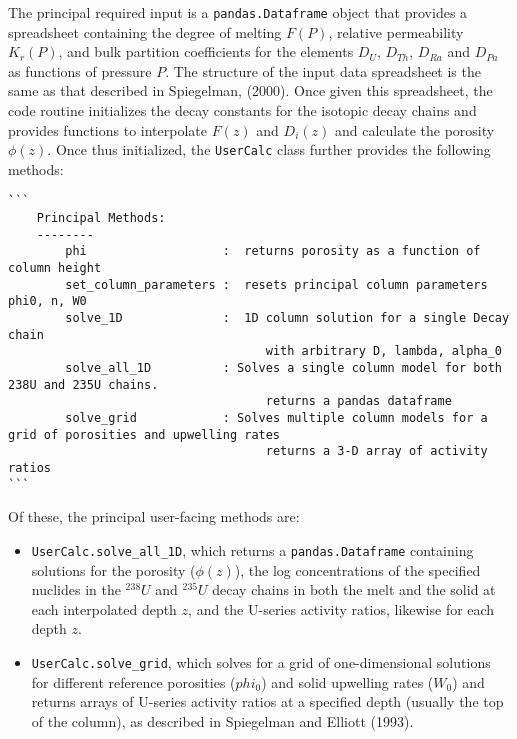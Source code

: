 \documentclass[11pt]{article}
\begin{document}
The principal required input is a \colorbox{gray!20}{\texttt{pandas.Dataframe}} object that provides a spreadsheet containing the degree of melting $F(P)$, relative permeability $K_r(P)$, and bulk partition coefficients for the elements $D_U$, $D_{Th}$, $D_{Ra}$ and $D_{Pa}$ as functions of pressure $P$. The structure of the input data spreadsheet is the same as that described in Spiegelman, (2000). Once given this spreadsheet, the code routine initializes the decay constants for the isotopic decay chains and provides functions to interpolate $F(z)$ and $D_i(z)$ and calculate the porosity $\phi(z)$. Once thus initialized, the \colorbox{gray!20}{\texttt{UserCalc}} class further provides the following methods:
\bigskip
\begin{lstlisting}
```
    Principal Methods:
    --------
        phi                   :  returns porosity as a function of column height
        set_column_parameters :  resets principal column parameters phi0, n, W0
        solve_1D              :  1D column solution for a single Decay chain 
                                    with arbitrary D, lambda, alpha_0
        solve_all_1D          : Solves a single column model for both 238U and 235U chains.  
                                    returns a pandas dataframe
        solve_grid            : Solves multiple column models for a grid of porosities and upwelling rates
                                    returns a 3-D array of activity ratios    
```
\end{lstlisting}
\bigskip

Of these,  the principal user-facing methods are:

\begin{itemize}
	\item \colorbox{gray!20}{\texttt{UserCalc.solve\_all\_1D}}, which returns a \colorbox{gray!20}{\texttt{pandas.Dataframe}} containing solutions for the porosity ($\phi(z)$), the log concentrations of the specified nuclides in the $^{238}U$ and $^{235}U$ decay chains in both the melt and the solid at each interpolated depth $z$, and the U-series activity ratios, likewise for each depth $z$.
	\item \colorbox{gray!20}{\texttt{UserCalc.solve\_grid}}, which solves for a grid of one-dimensional solutions for different reference porosities ($phi_0$) and solid upwelling rates ($W_0$) and returns arrays of U-series activity ratios at a specified depth (usually the top of the column), as described in Spiegelman and Elliott (1993).
\end{itemize}
\end{document}
